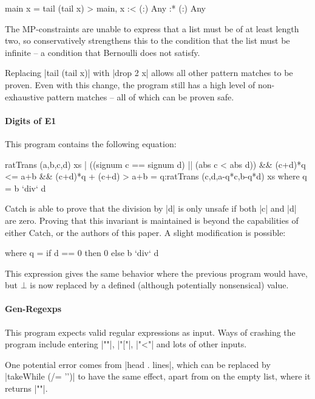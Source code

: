 \documentclass[preprint]{sigplanconf}
\begin{document}
\begin{code}
main x = tail (tail x)
> main, x :< {(:) Any} :* {(:) Any}
\end{code}

The MP-constraints are unable to express that a list must be of at least length two, so conservatively strengthens this to the condition that the list must be infinite -- a condition that Bernoulli does not satisfy.

Replacing |tail (tail x)| with |drop 2 x| allows all other pattern matches to be proven. Even with this change, the program still has a high level of non-exhaustive pattern matches -- all of which can be proven safe.


\paragraph{Digits of E1}

This program contains the following equation:

\begin{code}
ratTrans (a,b,c,d) xs |
  ((signum c == signum d) || (abs c < abs d)) &&
  (c+d)*q <= a+b && (c+d)*q + (c+d) > a+b
     = q:ratTrans (c,d,a-q*c,b-q*d) xs
  where q = b `div` d
\end{code}

Catch is able to prove that the division by |d| is only unsafe if both |c| and |d| are zero. Proving that this invariant is maintained is beyond the capabilities of either Catch, or the authors of this paper. A slight modification is possible:

\begin{code}
  where q = if d == 0 then 0 else b `div` d
\end{code}

This expression gives the same behavior where the previous program would have, but $\bot{}$ is now replaced by a defined (although potentially nonsensical) value.

\paragraph{Gen-Regexps}

This program expects valid regular expressions as input. Ways of crashing the program include entering |""|, |"["|, |"<"| and lots of other inputs.

One potential error comes from |head . lines|, which can be replaced by |takeWhile (/= '\n')| to have the same effect, apart from on the empty list, where it returns |""|.
\end{document}
